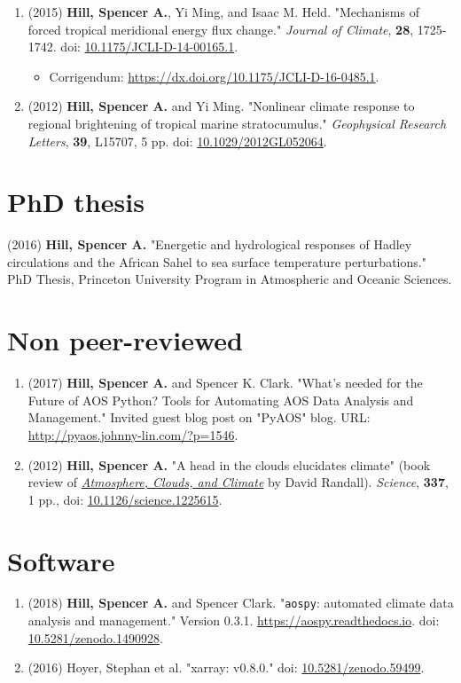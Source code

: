 \documentclass[12pt,letterpaper]{shillcv}
\begin{document}
\begin{enumerate}
{of Advances in Modeling Earth Systems}, \textbf{9}, 1760-1771.  doi: \href{https://doi.org/10.1002/2017MS001038}{10.1002/2017MS001038}.
\item (2015) \textbf{Hill, Spencer A.}, Yi Ming, and Isaac M. Held.  "Mechanisms of forced
tropical meridional energy flux change."  \emph{Journal of Climate}, \textbf{28},
1725-1742.  doi: \href{http://dx.doi.org/10.1175/JCLI-D-14-00165.1}{10.1175/JCLI-D-14-00165.1}.
\begin{itemize}
\item Corrigendum: \url{https://dx.doi.org/10.1175/JCLI-D-16-0485.1}.
\end{itemize}
\item (2012) \textbf{Hill, Spencer A.} and Yi Ming.  "Nonlinear climate response to regional
brightening of tropical marine stratocumulus."  \emph{Geophysical Research Letters},
\textbf{39}, L15707, 5 pp. doi:
\href{http://dx.doi.org/10.1029/2012GL052064}{10.1029/2012GL052064}.
\end{enumerate}
\section*{PhD thesis}
\label{sec:org3c523af}
(2016) \textbf{Hill, Spencer A.} "Energetic and hydrological responses of Hadley
circulations and the African Sahel to sea surface temperature perturbations."
PhD Thesis, Princeton University Program in Atmospheric and Oceanic Sciences.
\section*{Non peer-reviewed}
\label{sec:orga0e4790}
\begin{enumerate}
\item (2017) \textbf{Hill, Spencer A.} and Spencer K. Clark.  "What’s needed for the Future
of AOS Python? Tools for Automating AOS Data Analysis and Management."
Invited guest blog post on "PyAOS" blog.  URL:
\url{http://pyaos.johnny-lin.com/?p=1546}.
\item (2012) \textbf{Hill, Spencer A.}  "A head in the clouds elucidates climate" (book
review of \href{http://press.princeton.edu/titles/9773.html}{\emph{Atmosphere, Clouds, and Climate}} by David Randall). \emph{Science}, \textbf{337},
1 pp., doi: \href{http://dx.doi.org/10.1126/science.1225615}{10.1126/science.1225615}.
\end{enumerate}
\section*{Software}
\label{sec:org8f2aa33}
\begin{enumerate}
\item (2018) \textbf{Hill, Spencer A.} and Spencer Clark.  "\texttt{aospy}: automated climate
data analysis and management."  Version 0.3.1.  \url{https://aospy.readthedocs.io}.
doi: \href{https://doi.org/10.5281/zenodo.1490928}{10.5281/zenodo.1490928}.
\item (2016) Hoyer, Stephan et al.  "xarray: v0.8.0."  doi: \href{https://doi.org/10.5281/zenodo.59499}{10.5281/zenodo.59499}.
\end{enumerate}
\end{document}

